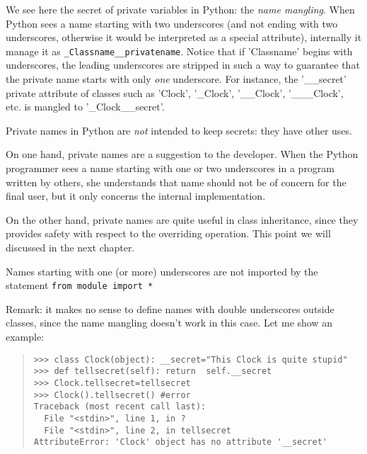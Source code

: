 \documentclass[10pt,english]{article}
\begin{document}
We see here the secret of private variables in Python: the \emph{name mangling}.
When Python sees a name starting with two underscores (and not ending
with two underscores, otherwise it would be interpreted as a special
attribute), internally it manage it as \texttt{{\_}Classname{\_}{\_}privatename}.
Notice that if 'Classname' begins with underscores, the leading underscores
are stripped in such a way to guarantee that the private name starts with
only \emph{one} underscore. For instance, the '{\_}{\_}secret' private attribute 
of classes such as 'Clock', '{\_}Clock', '{\_}{\_}Clock', '{\_}{\_}{\_}Clock', etc. is
mangled to '{\_}Clock{\_}{\_}secret'.

Private names in Python are \emph{not} intended to keep secrets: they
have other uses.
\begin{list}{.}
{
\setlength{\rightmargin}{\leftmargin}
}
\item {} 
On one hand, private names are a suggestion to the developer. 
When the Python programmer sees a name starting with one or two 
underscores in a program written by others, she understands
that name should not be of concern for the final user, but it 
only concerns the internal implementation.

\item {} 
On the other hand, private names are quite useful in class
inheritance, since they provides safety with respect to the overriding
operation. This point we will discussed in the next chapter.

\item {} 
Names starting with one (or more) underscores are not imported by the 
statement \texttt{from module import *}

\end{list}

Remark: it makes no sense to define names with double underscores
outside classes, since the name mangling doesn't work in this case.
Let me show an example:
\begin{quote}
\begin{verbatim}>>> class Clock(object): __secret="This Clock is quite stupid"
>>> def tellsecret(self): return  self.__secret
>>> Clock.tellsecret=tellsecret
>>> Clock().tellsecret() #error
Traceback (most recent call last):
  File "<stdin>", line 1, in ?
  File "<stdin>", line 2, in tellsecret
AttributeError: 'Clock' object has no attribute '__secret'\end{verbatim}
\end{quote}
\end{document}
